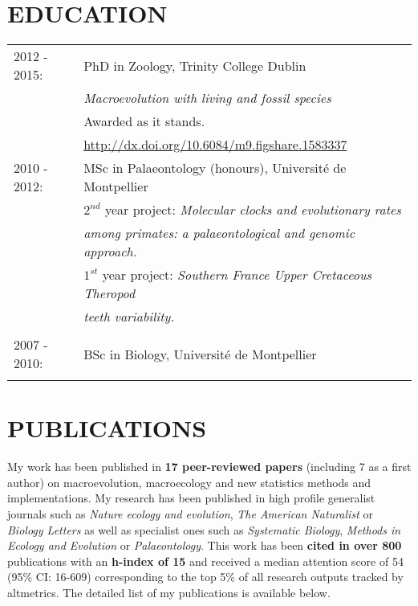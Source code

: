 \documentclass[10pt,a4paper]{article}
\begin{document}
{\begin{tabular}{ll}
\end{tabular}

\section{EDUCATION}
\raggedright
\begin{tabular}{ll} 
2012 - 2015: & PhD in Zoology, Trinity College Dublin\\
& \textit{Macroevolution with living and fossil species} \\
& Awarded as it stands. \\
& \href{http://figshare.com/articles/Macroevolution_with_living_and_fossil_species/1583337}{http://dx.doi.org/10.6084/m9.figshare.1583337} \\
2010 - 2012: & MSc in Palaeontology (honours), Universit\'{e} de Montpellier\\
& $2^{nd}$ year project: \textit{Molecular clocks and evolutionary rates}\\
& \textit{among primates: a palaeontological and genomic approach.} \\
& $1^{st}$ year project: \textit{Southern France Upper Cretaceous Theropod}\\
& \textit{teeth variability.} \\
& \\
2007 - 2010: & BSc in Biology, Universit\'{e} de Montpellier\\
& \\
\end{tabular}



\section{PUBLICATIONS}
My work has been published in \textbf{17 peer-reviewed papers} (including 7 as a first author) on macroevolution, macroecology and new statistics methods and implementations.
My research has been published in high profile generalist journals such as \textit{Nature ecology and evolution}, \textit{The American Naturalist} or \textit{Biology Letters} as well as specialist ones such as \textit{Systematic Biology}, \textit{Methods in Ecology and Evolution} or \textit{Palaeontology}.
This work has been \textbf{cited in over 800} %
publications with an \textbf{h-index of 15} %
and received a median attention score of 54 (95\% CI: 16-609) %
corresponding to the top 5\% of all research outputs tracked by altmetrics.
The detailed list of my publications is available below.

}
\end{document}
